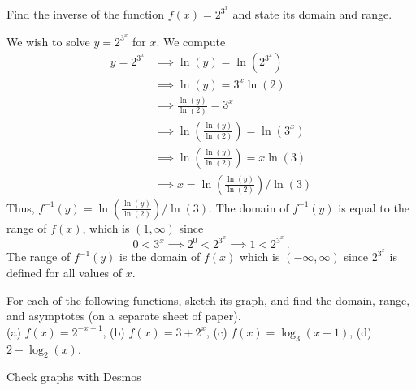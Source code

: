 \documentclass[11pt]{exam}
\begin{document}
\begin{questions}
      \vspace{1.5in}
    \question Find the inverse of the function \(f(x) = 2^{3^x}\) and
    state its domain and range.
    \begin{solution}
      We wish to solve \(y = 2^{3^x}\) for \(x\). We compute
      \begin{align*}
        y = 2^{3^x}
        & \implies \ln(y) = \ln(2^{3^x}) \\
        & \implies \ln(y) = 3^x \ln(2) \\
        & \implies \frac{\ln(y)}{\ln(2)} = 3^x\\
        & \implies \ln \left(\frac{\ln(y)}{\ln(2)}  \right) = \ln(3^x)
        \\
        & \implies  \ln \left(\frac{\ln(y)}{\ln(2)}  \right) = x
          \ln(3)\\
        & \implies  x = \ln \left(\frac{\ln(y)}{\ln(2)}  \right)/\ln(3)
      \end{align*}
      Thus, \(f^{-1}(y) = \ln \left(\frac{\ln(y)}{\ln(2)}
      \right)/\ln(3)\). The domain of \(f^{-1}(y)\) is equal to the
      range of \(f(x)\), which is \((1,\infty)\) since \[
        0 < 3^x \implies 2^0 < 2^{3^x} \implies 1 < 2^{3^x} \,.
      \]
      The range of \(f^{-1}(y)\) is the domain of \(f(x)\) which is
      \((-\infty,\infty)\) since \(2^{3^x}\) is defined for all values
      of \(x\).
    \end{solution}
    \vspace{0.75in}
    \question For each of the following functions, sketch its graph,
    and find the domain, range, and asymptotes (on a separate sheet of
    paper). \\
    (a) \(f(x) = 2^{-x+1}\), (b) \(f(x)=3+2^x\), (c) \(f(x) =
    \log_3(x-1)\), (d)  \(2-\log_2(x)\).
    \begin{solution}
      Check graphs with Desmos
 

\end{solution}
\end{questions}
\end{document}
